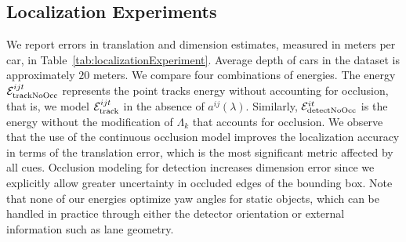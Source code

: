 \subsection{Localization Experiments}
We report errors in translation and dimension estimates, measured in meters per car, in Table~\ref{tab:localizationExperiment}. Average depth of cars in the dataset is approximately $20$ meters. We compare four combinations of energies.  The energy $\mathcal{E}^{ijt}_{\text{trackNoOcc}}$ represents the point tracks energy without accounting for occlusion, that is, we model $\mathcal{E}^{ijt}_{\text{track}}$ in the absence of $a^{ij} (\lambda)$. Similarly, $\mathcal{E}^{it}_{\text{detectNoOcc}}$ is the energy without the modification of $\Lambda_k$ that accounts for occlusion. We observe that the use of the continuous occlusion model improves the localization accuracy in terms of the translation error, which is the most significant metric affected by all cues. Occlusion modeling for detection increases dimension error since we explicitly allow greater uncertainty in occluded edges of the bounding box. Note that none of our energies optimize yaw angles for static objects, which can be handled in practice through either the detector orientation or external information such as lane geometry.




